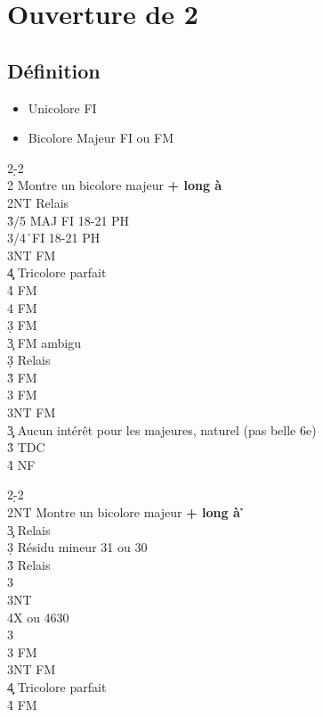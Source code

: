 \documentclass[a4paper]{article}
\begin{document}
\section{Ouverture de 2\pdfd}

\subsection{Définition}

\begin{itemize}
\item Unicolore FI

\item Bicolore Majeur FI ou FM

\end{itemize}

\begin{bidtable}
2\d-2\h\\
2\s \> Montre un bicolore majeur \textbf{+ long à \s }\+\\
2NT \> Relais\+\\
3\h {}/5 MAJ FI 18-21 PH\\
3\s {}\s /4\h\ FI 18-21 PH\\
3NT  FM\\
4\c\d \> Tricolore parfait\\
4\h {} FM\\
4\s {} FM\\
3\d {} FM\\
3\c \> FM ambigu\+\\
3\d \> Relais\+\\
3\h {} FM\\
3\s {} FM\\
3NT  FM\-\-\-\\
3\c\d \> Aucun intérêt pour les majeures, naturel (pas belle 6e)\\
3\h\s \> TDC\\
4\h\s \> NF\-
\end{bidtable}

\begin{bidtable}
2\d-2\h\\
2NT \> Montre un bicolore majeur \textbf{+ long à \h }\+\\
3\c \> Relais\+\\
3\d \> Résidu mineur 31 ou 30\+\\
3\h \> Relais\+\\
3\s {}\\
3NT \\
4X  ou 4630\-\-\\
3\h\\
3\s {} FM\\
3NT  FM\\
4\c\d \> Tricolore parfait\\
4\h {} FM\-\-
\end{bidtable}
\end{document}
